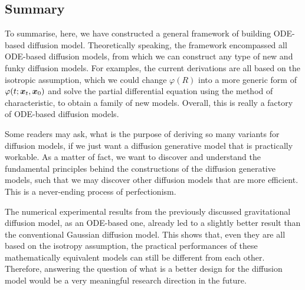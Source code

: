 \subsection{Summary}

To summarise, here, we have constructed a general framework of building ODE-based diffusion model. Theoretically speaking, the framework encompassed all ODE-based diffusion models, from which we can construct any type of new and funky diffusion models. For examples, the current derivations are all based on the isotropic assumption, which we could change $\varphi(R)$ into a more generic form of $\varphi(t;\bm{x}_{t},\bm{x}_0)$ and solve the partial differential equation using the method of characteristic, to obtain a family of new models. Overall, this is really a factory of ODE-based diffusion models.

Some readers may ask, what is the purpose of deriving so many variants for diffusion models, if we just want a diffusion generative model that is practically workable. As a matter of fact, we want to discover and understand the fundamental principles behind the constructions of the diffusion generative models, such that we may discover other diffusion models that are more efficient. This is a never-ending process of perfectionism. 


The numerical experimental results from the previously discussed gravitational diffusion model, as an ODE-based one, already led to a slightly better result than the conventional Gaussian diffusion model. This shows that, even they are all based on the isotropy assumption, the practical performances of these mathematically equivalent models can still be different from each other. Therefore, answering the question of what is a better design for the diffusion model would be a very meaningful research direction in the future.